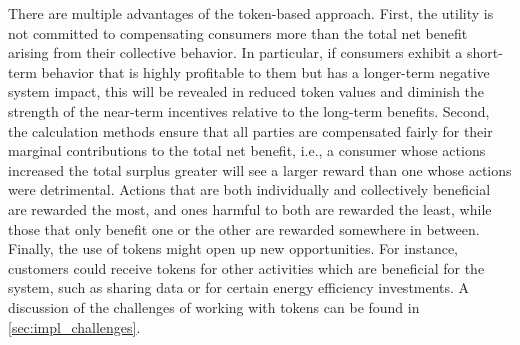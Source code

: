 There are multiple advantages of the token-based approach. 
First, the utility is not committed to compensating consumers more than the total net benefit arising from their collective behavior. In particular, if consumers exhibit a short-term behavior that is highly profitable to them but has a longer-term negative system impact, this will be revealed in reduced token values and diminish the strength of the near-term incentives relative to the long-term benefits.  
Second, the calculation methods ensure that all parties are compensated fairly for their marginal contributions to the total net benefit, i.e., a consumer whose actions increased the total surplus greater will see a larger reward than one whose actions were detrimental. Actions that are both individually and collectively beneficial are rewarded the most, and ones harmful to both are rewarded the least, while those that only benefit one or the other are rewarded somewhere in between.  
Finally, the use of tokens might open up new opportunities. For instance, customers could receive tokens for other activities which are beneficial for the system, such as sharing data or for certain energy efficiency investments.
A discussion of the challenges of working with tokens can be found in \cref{sec:impl_challenges}.




